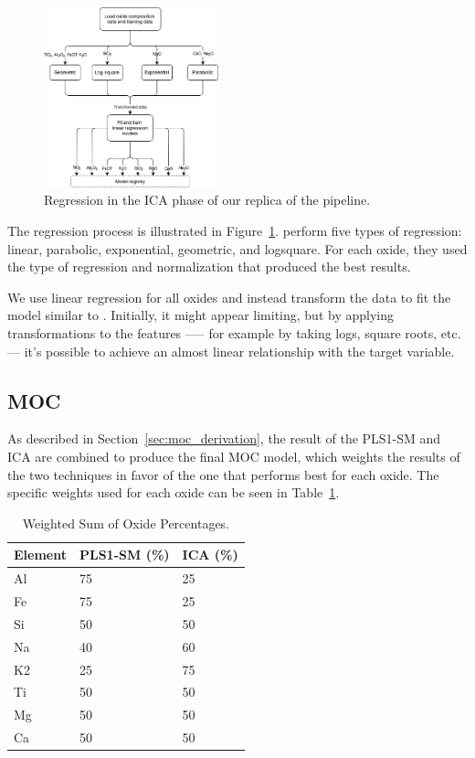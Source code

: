 \begin{figure}
	\centering
	\includegraphics[width=0.45\textwidth]{images/ica_regression.png}
	\caption{Regression in the ICA phase of our replica of the pipeline.}
	\label{fig:ica_regression}
\end{figure}

The regression process is illustrated in Figure~\ref{fig:ica_regression}.
\citet{cleggRecalibrationMarsScience2017} perform five types of regression: linear, parabolic, exponential, geometric, and logsquare.
For each oxide, they used the type of regression and normalization that produced the best results.

We use linear regression for all oxides and instead transform the data to fit the model similar to \citet{kuo_detecting_2018}.
Initially, it might appear limiting, but by applying transformations to the features --— for example by taking logs, square roots, etc. --- it's possible to achieve an almost linear relationship with the target variable.

\subsection{MOC}\label{sec:methodology_moc}
As described in Section~\ref{sec:moc_derivation}, the result of the PLS1-SM and ICA are combined to produce the final MOC model, which weights the results of the two techniques in favor of the one that performs best for each oxide.
The specific weights used for each oxide can be seen in Table~\ref{tab:weighted_sum_oxide}.

\begin{table}[h]
\centering
\begin{tabular*}{\columnwidth}{@{\extracolsep{\fill}}lll}
\toprule
Element  & PLS1-SM (\%) & ICA (\%) \\ \midrule
Al       & 75           & 25      \\
Fe       & 75           & 25      \\
Si       & 50           & 50      \\
Na       & 40           & 60      \\
K2       & 25           & 75      \\
Ti       & 50           & 50      \\
Mg       & 50           & 50      \\
Ca       & 50           & 50      \\
\bottomrule
\end{tabular*}
\caption{Weighted Sum of Oxide Percentages.}
\label{tab:weighted_sum_oxide}
\end{table}